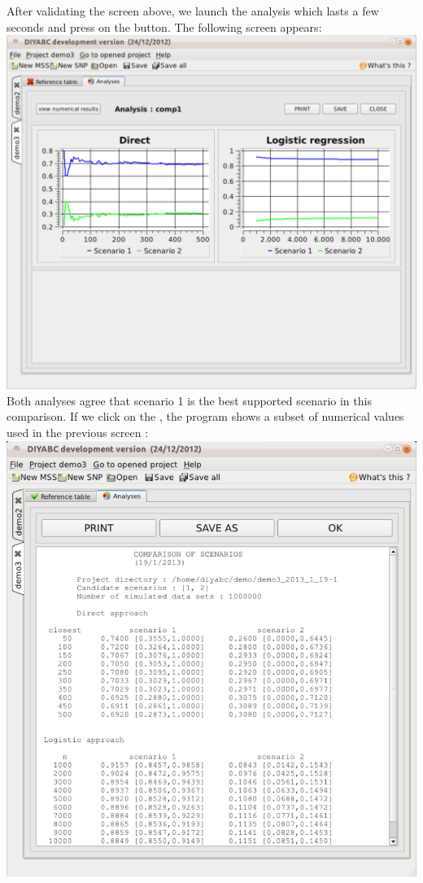 After validating the screen above, we launch the analysis which lasts a few seconds and press on the  button. The following screen appears:\\

 \includegraphics[scale=0.38]{gui_pictures/Capture-DIYABC-111.png} \\

Both analyses agree that scenario 1 is the best supported scenario in this comparison. If we click on the , the program shows a subset of numerical values used in the previous screen :\\

 \includegraphics[scale=0.38]{gui_pictures/Capture-DIYABC-112.png} \\

